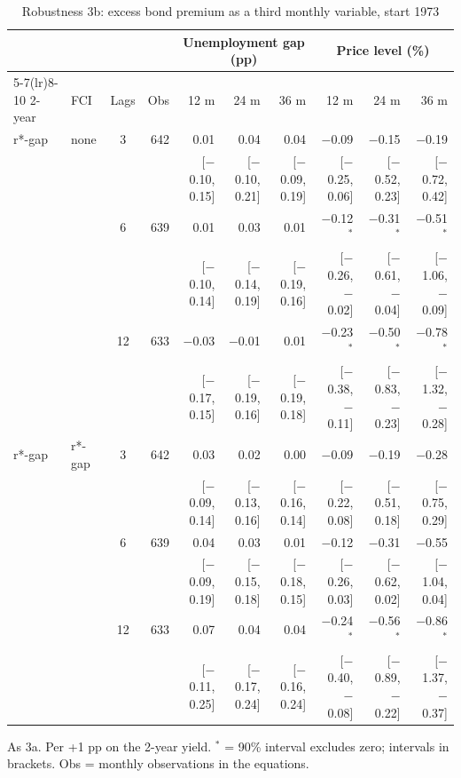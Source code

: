 \begin{table}[p]\centering\footnotesize\setlength{\tabcolsep}{2.2pt}
\caption{Robustness 3b: excess bond premium as a third monthly variable, start 1973}\label{tab:R3b}
\begin{tabular}{llcrrrrrrr}\toprule
 & & & & \multicolumn{3}{c}{Unemployment gap (pp)} & \multicolumn{3}{c}{Price level (\%)}\\ \cmidrule(lr){5-7}\cmidrule(lr){8-10}
2-year & FCI & Lags & Obs & 12 m & 24 m & 36 m & 12 m & 24 m & 36 m\\ \midrule
r*-gap & none & 3 & 642 & 0.01 & 0.04 & 0.04 & $-$0.09 & $-$0.15 & $-$0.19\\
 & & & & {\scriptsize [$-$0.10, 0.15]} & {\scriptsize [$-$0.10, 0.21]} & {\scriptsize [$-$0.09, 0.19]} & {\scriptsize [$-$0.25, 0.06]} & {\scriptsize [$-$0.52, 0.23]} & {\scriptsize [$-$0.72, 0.42]}\\
 &  & 6 & 639 & 0.01 & 0.03 & 0.01 & $-$0.12$^{*}$ & $-$0.31$^{*}$ & $-$0.51$^{*}$\\
 & & & & {\scriptsize [$-$0.10, 0.14]} & {\scriptsize [$-$0.14, 0.19]} & {\scriptsize [$-$0.19, 0.16]} & {\scriptsize [$-$0.26, $-$0.02]} & {\scriptsize [$-$0.61, $-$0.04]} & {\scriptsize [$-$1.06, $-$0.09]}\\
 &  & 12 & 633 & $-$0.03 & $-$0.01 & 0.01 & $-$0.23$^{*}$ & $-$0.50$^{*}$ & $-$0.78$^{*}$\\
 & & & & {\scriptsize [$-$0.17, 0.15]} & {\scriptsize [$-$0.19, 0.16]} & {\scriptsize [$-$0.19, 0.18]} & {\scriptsize [$-$0.38, $-$0.11]} & {\scriptsize [$-$0.83, $-$0.23]} & {\scriptsize [$-$1.32, $-$0.28]}\\
r*-gap & r*-gap & 3 & 642 & 0.03 & 0.02 & 0.00 & $-$0.09 & $-$0.19 & $-$0.28\\
 & & & & {\scriptsize [$-$0.09, 0.14]} & {\scriptsize [$-$0.13, 0.16]} & {\scriptsize [$-$0.16, 0.14]} & {\scriptsize [$-$0.22, 0.08]} & {\scriptsize [$-$0.51, 0.18]} & {\scriptsize [$-$0.75, 0.29]}\\
 &  & 6 & 639 & 0.04 & 0.03 & 0.01 & $-$0.12 & $-$0.31 & $-$0.55\\
 & & & & {\scriptsize [$-$0.09, 0.19]} & {\scriptsize [$-$0.15, 0.18]} & {\scriptsize [$-$0.18, 0.15]} & {\scriptsize [$-$0.26, 0.03]} & {\scriptsize [$-$0.62, 0.02]} & {\scriptsize [$-$1.04, 0.04]}\\
 &  & 12 & 633 & 0.07 & 0.04 & 0.04 & $-$0.24$^{*}$ & $-$0.56$^{*}$ & $-$0.86$^{*}$\\
 & & & & {\scriptsize [$-$0.11, 0.25]} & {\scriptsize [$-$0.17, 0.24]} & {\scriptsize [$-$0.16, 0.24]} & {\scriptsize [$-$0.40, $-$0.08]} & {\scriptsize [$-$0.89, $-$0.22]} & {\scriptsize [$-$1.37, $-$0.37]}\\
\bottomrule\end{tabular}
\par\smallskip\parbox{0.96\linewidth}{\scriptsize As 3a. Per +1 pp on the 2-year yield. $^{*}$ = 90\% interval excludes zero; intervals in brackets. Obs = monthly observations in the equations.}
\end{table}
